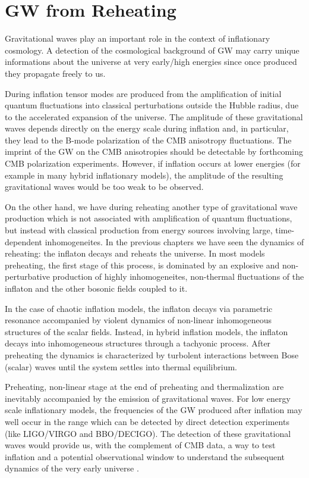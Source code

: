 \documentclass[11pt,a4paper,twoside]{book}
\begin{document}
\chapter{GW from Reheating}
Gravitational waves play an important role in the context of inflationary cosmology. A detection of the cosmological background of GW may carry unique informations about the universe  at very early/high energies since once produced they propagate freely to us.

 During inflation tensor modes are produced from the amplification of initial quantum fluctuations into classical perturbations outside the Hubble radius, due to the accelerated expansion of the universe. The amplitude of these gravitational waves depends directly on the energy scale during inflation and, in particular, they lead to the B-mode polarization of the CMB anisotropy fluctuations. The imprint of the GW on the CMB anisotropies should be detectable by forthcoming CMB polarization experiments. However, if inflation occurs at lower energies (for example in many hybrid inflationary models), the amplitude of the resulting gravitational waves would be too weak to be observed. 

 On the other hand, we have during reheating another type of gravitational wave production which is not associated with amplification of quantum fluctuations, but instead with classical production from energy sources involving large, time-dependent inhomogeneites. In the previous chapters we have seen the dynamics of reheating: the inflaton decays and reheats the universe. In most models preheating, the first stage of this process, is dominated by an explosive and non-perturbative production of highly inhomogeneites, non-thermal fluctuations of the inflaton and the other bosonic fields coupled to it.
 
 In the case of chaotic inflation models, the inflaton decays via parametric resonance accompanied by violent dynamics of non-linear inhomogeneous structures of the scalar fields. Instead, in hybrid inflation models, the inflaton decays into inhomogeneous structures through a tachyonic process. After preheating the dynamics is characterized by turbolent interactions between Bose (scalar) waves until the system settles into thermal equilibrium.
 
 Preheating, non-linear stage at the end of preheating and thermalization are inevitably accompanied by the emission of gravitational waves. For low energy scale inflationary models, the frequencies of the GW produced after inflation may well occur in the range which can be detected by direct detection experiments (like LIGO/VIRGO and BBO/DECIGO). The detection of these gravitational waves would provide us, with the complement of CMB data, a way to test inflation and a potential observational window to understand the subsequent dynamics of the very early universe \cite{Chap7:GreenMethod}.
 
\end{document}
